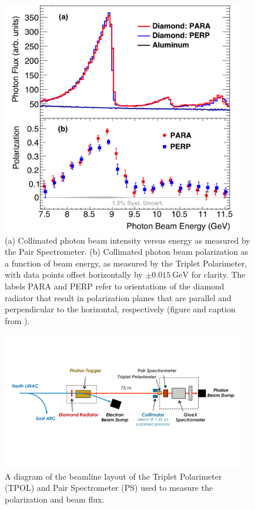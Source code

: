 \begin{figure}
  \begin{center}
    \includegraphics[width=0.95\textwidth]{figures/gluex_polarization.png}
  \end{center}
  \caption{(a) Collimated photon beam intensity versus energy as measured by the Pair Spectrometer. (b) Collimated photon beam polarization as a function of beam energy, as measured by the Triplet Polarimeter, with data points offset horizontally by $\pm\SI{0.015}{\giga\eV}$ for clarity. The labels PARA and PERP refer to orientations of the diamond radiator that result in polarization planes that are parallel and perpendicular to the horizontal, respectively (figure and caption from \cite{adhikari_gluex_2021}).}\label{fig:gluex-polarization}
\end{figure}


\begin{figure}
  \begin{center}
    \includegraphics[width=0.95\textwidth]{figures/gluex_beamline.png}
  \end{center}
  \caption{A diagram of the beamline layout of the Triplet Polarimeter (TPOL) and Pair Spectrometer (PS) used to measure the polarization and beam flux.}\label{fig:gluex-beamline}
\end{figure}


